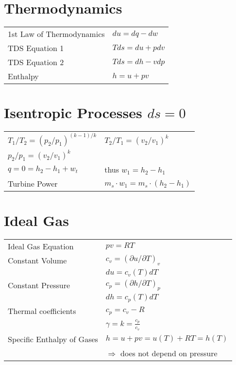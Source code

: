 




\begin{multicols*}{2}

\section*{Thermodynamics}
\begin{tabular}{l l}
    1st Law of Thermodynamics & $du = dq - dw$  \\
    TDS Equation 1 & $Tds = du + pdv$ \\
    TDS Equation 2 & $Tds = dh - vdp$ \\
    Enthalpy & $h = u + pv$
\end{tabular}

\section*{Isentropic Processes $ds = 0$}
\begin{tabular}{l l}
     $T_1 / T_2 = (p_2 / p_1)^{(k-1)/k} $ & $T_2 / T_1 = (v_2 / v_1)^k$  \\
    $p_2 / p_1 = (v_2 / v_1)^k$ & \\
    $q = 0 = h_2 -h_1 + w_t $ & thus $w_1 = h_2 - h_1$ \\
    Turbine Power & $ m_s \cdot w_1 = m_s \cdot (h_2 - h_1) $ \\
\end{tabular}

\section*{Ideal Gas}
\begin{tabular}{l l}
    Ideal Gas Equation & $pv = RT$ \\
    Constant Volume & $c_v = (\partial u / \partial T)_v$ \\
     & $du = c_v (T) dT$ \\
     Constant Pressure & $c_p = (\partial h / \partial T)_p$ \\
     & $dh = c_p (T) dT$ \\
     Thermal coefficients & $c_p = c_v - R$ \\
      & $\gamma = k = \frac{c_p}{c_v}$ \\
      Specific Enthalpy of Gases & $h = u + pv = u(T) + RT = h(T)$ \\
       & $\Rightarrow$ does not depend on pressure
\end{tabular}

\end{multicols*}
